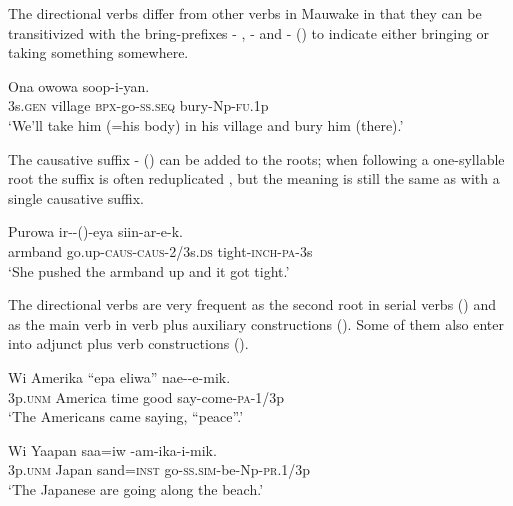 The directional verbs differ from other verbs in Mauwake in that they can be transitivized with the bring-prefixes - , - and - () to indicate either bringing or taking something somewhere.

\ea%
\label{ex:3:x286}
\gll Ona owowa  soop-i-yan. \\
3s.\textsc{gen} village \textsc{bpx}-go-\textsc{ss}.\textsc{seq} bury-Np-\textsc{fu}.1p \\
\glt`We'll take him (=his body) in his village and bury him (there).'
\z

The causative suffix \nobreakdash-\textstyleEmphasizedWords{} ()\textstyleEmphasizedWords{} can be added to the roots; when following a one-syllable root the suffix is often reduplicated , but the meaning is still the same as with a single causative suffix.

\ea%
\label{ex:3:x435}
\gll Purowa ir--()-eya siin-ar-e-k. \\
armband go.up-\textsc{caus}-\textsc{caus}-2/3s.\textsc{ds} tight-\textsc{inch}-\textsc{pa}-3s\\
\glt`She pushed the armband up and it got tight.'
\z

The directional verbs are very frequent as the second root in serial verbs \linebreak  () and as the main verb in verb plus auxiliary constructions  (). Some of them also enter into adjunct plus verb constructions  (). 

\ea%
\label{ex:3:x287}
\gll Wi Amerika ``epa eliwa'' nae--e-mik. \\
3p.\textsc{unm} America time good say-come-\textsc{pa}-1/3p \\
\glt`The Americans came saying, ``peace''.'
\z

\ea%
\label{ex:3:x288}
\gll Wi Yaapan saa=iw -am-ika-i-mik. \\
3p.\textsc{unm} Japan sand=\textsc{inst} go-\textsc{ss}.\textsc{sim}-be-Np-\textsc{pr}.1/3p \\
\glt`The Japanese are going along the beach.'
\z

